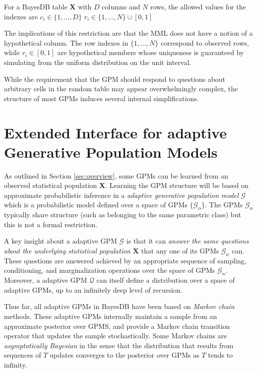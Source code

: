 \documentclass[10pt,letterpaper]{article}
\newcommand{\set}[1]{\{#1\}}
\begin{document}
For a BayesDB table $\mathbf{X}$ with $D$ columns and $N$ rows, the allowed
values for the indexes are
    \subitem $c_i \in \set{1,\dots,D}$
    \subitem $r_i \in \set{1,\dots,N} \cup [0,1]$

The implications of this restriction are that the MML does not have a notion of
a hypothetical column. The row indexes in $\set{1,\dots,N}$ correspond to
observed rows, while $r_i \in [0,1]$ are hypothetical members whose uniqueness
is guaranteed by simulating from the uniform distribution on the unit interval.

While the requirement that the GPM should respond to questions about arbitrary
cells in the random table may appear overwhelmingly complex, the structure of
most GPMs induces several internal simplifications.

\section{Extended Interface for adaptive Generative Population Models}
\label{sec:adaptive_gpm}

As outlined in Section \ref{sec:overview}, some GPMs can be learned from an
observed statistical population $\mathbf{X}$. Learning the GPM structure will be
based on approximate probabilistic inference in a \textit{adaptive generative
population model} $\mathcal{G}$ which is a probabilistic model defined over a
space of GPMs $\set{\mathcal{G_\alpha}}$. The GPMs $\mathcal{G}_\alpha$
typically share structure (such as belonging to the same parametric class) but
this is not a formal restriction.

A key insight about a adaptive GPM $\mathcal{G}$ is that it can \textit{answer
the same questions about the underlying statistical population} $\mathbf{X}$
that any one of its GPMs $\mathcal{G}_\alpha$ can. These questions are answered
achieved by an appropriate sequence of sampling, conditioning, and
marginalization operations over the space of GPMs $\mathcal{G}_\alpha$.
Moreover, a adaptive GPM $\mathcal{Q}$ can itself define a distribution over a
space of adaptive GPMs, up to an infinitely deep level of recursion.

Thus far, all adaptive GPMs in BayesDB have been based on \textit{Markov chain}
methods. These adaptive GPMs internally maintain a sample from an approximate
posterior over GPMS, and provide a Markov chain transition operator that updates
the sample stochastically. Some Markov chains are \textit{asymptotically
Bayesian} in the sense that the distribution that results from sequences of $T$
updates converges to the posterior over GPMs as $T$ tends to infinity.
\end{document}
